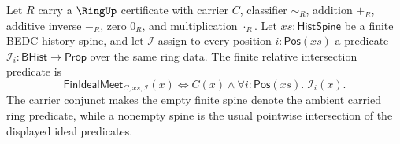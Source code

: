 \begin{definition}
\label{def:finite-ideal-intersection-predicate}
Let $R$ carry a $\RingUp$ certificate with carrier $C$, classifier $\sim_R$, addition $+_R$, additive inverse $-_R$, zero $0_R$, and multiplication $\cdot_R$. Let $xs:\mathsf{HistSpine}$ be a finite BEDC-history spine, and let $\mathcal{I}$ assign to every position $i:\mathsf{Pos}(xs)$ a predicate $\mathcal{I}_i:\mathsf{BHist}\to\mathsf{Prop}$ over the same ring data. The finite relative intersection predicate is
$$
\mathsf{FinIdealMeet}_{C,xs,\mathcal{I}}(x)
\Longleftrightarrow
C(x)\land \forall i:\mathsf{Pos}(xs).\;\mathcal{I}_i(x).
$$
The carrier conjunct makes the empty finite spine denote the ambient carried ring predicate, while a nonempty spine is the usual pointwise intersection of the displayed ideal predicates.
\end{definition}

